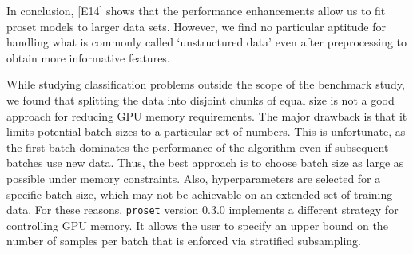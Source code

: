 %
In conclusion, [E14] shows that the performance enhancements allow us to fit proset models to larger data sets.
However, we find no particular aptitude for handling what is commonly called `unstructured data' even after preprocessing to obtain more informative features.
%
\begin{center}\end{center}
%
While studying classification problems outside the scope of the benchmark study, we found that splitting the data into disjoint chunks of equal size is not a good approach for reducing GPU memory requirements.
The major drawback is that it limits potential batch sizes to a particular set of numbers.
This is unfortunate, as the first batch dominates the performance of the algorithm even if subsequent batches use new data.
Thus, the best approach is to choose batch size as large as possible under memory constraints.
Also, hyperparameters are selected for a specific batch size, which may not be achievable on an extended set of training data.
For these reasons, \texttt{proset} version 0.3.0 implements a different strategy for controlling GPU memory.
It allows the user to specify an upper bound on the number of samples per batch that is enforced via stratified subsampling.\par
%
